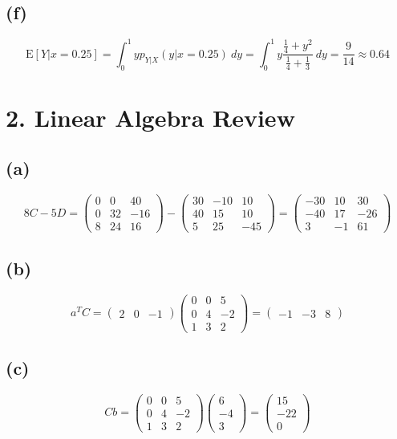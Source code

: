 \documentclass[fleqn, letterpaper]{tufte-handout}
\newcommand{\E}{\text{E}}
\begin{document}
\subsection{(f)}
\[
        \E[Y|x=0.25]
        = \int_0^1 yp_{Y|X}(y|x = 0.25)\ dy
        = \int_0^1 y\frac{\frac{1}{4}+y^2}{\frac{1}{4}+\frac{1}{3}}\ dy
        = \frac{9}{14} \approx 0.64
\]
\section{2. Linear Algebra Review}
\subsection{(a)}
\[
8C-5D = \left(\begin{array}{ccc} 0 & 0 & 40\\ 0 & 32 & -16\\ 8 & 24 & 16 \end{array}\right)
- \left(\begin{array}{ccc} 30 & -10 & 10\\ 40 & 15 & 10\\ 5 & 25 & -45 \end{array}\right)
=\left(\begin{array}{ccc} -30 & 10 & 30\\ -40 & 17 & -26\\ 3 & -1 & 61 \end{array}\right)
\]
\subsection{(b)}
\[
a^TC = \left(\begin{array}{ccc} 2 & 0 & -1 \end{array}\right)
\left(\begin{array}{ccc} 0 & 0 & 5\\ 0 & 4 & -2\\ 1 & 3 & 2 \end{array}\right)
= \left(\begin{array}{ccc} -1 & -3 & 8 \end{array}\right)
\]
\subsection{(c)}
\[
Cb = 
\left(\begin{array}{ccc} 0 & 0 & 5\\ 0 & 4 & -2\\ 1 & 3 & 2 \end{array}\right)
\left(\begin{array}{c} 6\\ -4\\ 3 \end{array}\right) =
\left(\begin{array}{c} 15\\ -22\\ 0 \end{array}\right)
\]
\end{document}
